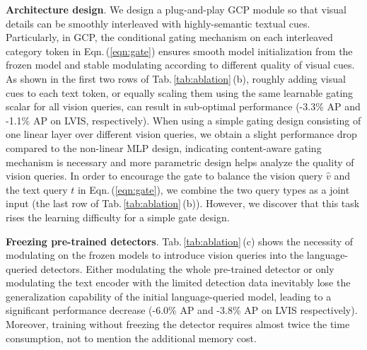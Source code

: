 \textbf{Architecture design}.
We design a plug-and-play GCP module so that visual details can be smoothly interleaved with highly-semantic textual cues. Particularly, in GCP, the conditional gating mechanism on each interleaved category token in Eqn.\,(\ref{eqn:gate}) ensures smooth model initialization from the frozen model and stable modulating according to different quality of visual cues. As shown in the first two rows of Tab.\,\ref{tab:ablation}\,(b), roughly adding visual cues to each text token, or equally scaling them using the same learnable gating scalar for all vision queries, can result in sub-optimal performance (-3.3\% AP and -1.1\% AP on LVIS, respectively). When using a simple gating design consisting of one linear layer over different vision queries, we obtain a slight performance drop compared to the non-linear MLP design, indicating content-aware gating mechanism is necessary and more parametric design helps analyze the quality of vision queries. In order to encourage the gate to balance the vision query $\hat{v}$ and the text query $t$ in Eqn.\,(\ref{eqn:gate}), we combine the two query types as a joint input (the last row of Tab.\,\ref{tab:ablation}\,(b)). However, we discover that this task rises the learning difficulty for a simple gate design.


\textbf{Freezing pre-trained detectors}.
Tab.\,\ref{tab:ablation}\,(c) shows the necessity of modulating on the frozen models to introduce vision queries into the language-queried detectors.
Either modulating the whole pre-trained detector or only modulating the text encoder with the limited detection data inevitably lose the generalization capability of the initial language-queried model, leading to  a significant performance decrease (-6.0\% AP and  -3.8\% AP on LVIS respectively).
Moreover,  training without freezing the detector requires almost twice the time consumption, not to mention the additional memory cost.
















































